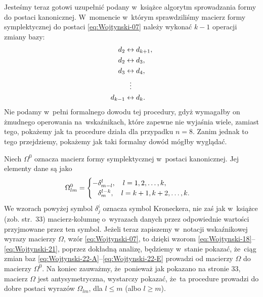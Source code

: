 \documentclass[a4paper,11pt]{article}
\begin{document}
Jesteśmy teraz gotowi uzupełnić podany w~książce algorytm sprowadzania
formy do postaci kanonicznej. W~momencie w~którym sprawdziliśmy macierz
formy symplektycznej do postaci \eqref{eq:Wojtynski-07} należy wykonać
$k - 1$ operacji zmiany bazy:
\begin{subequations}
  \begin{align}
    \label{eq:Wojtynski-22-A}
    d_{ 2 } &\leftrightarrow d_{ k + 1 }, \\
    \label{eq:Wojtynski-22-B}
    d_{ 2 } &\leftrightarrow d_{ 3 }, \\
    \label{eq:Wojtynski-22-C}
    d_{ 3 } &\leftrightarrow d_{ 4 }, \\
    \label{eq:Wojtynski-22-D}
    &\hspace{0.65em} \vdots \\
    \label{eq:Wojtynski-22-E}
    d_{ k - 1 } &\leftrightarrow d_{ k }.
  \end{align}
\end{subequations}
Nie podamy w~pełni formalnego dowodu tej procedury, gdyż wymagałby on
żmudnego operowania na~wskaźnikach, które zapewne nie wyjaśnia wiele,
zamiast tego, pokażemy jak ta procedure działa dla przypadku $n = 8$.
Zanim jednak to tego przejdziemy, pokażemy jak taki formalny dowód mógłby
wyglądać.

Niech $\Omega^{ 0 }$ oznacza macierz formy symplektycznej w~postaci kanonicznej.
Jej elementy dane są jako
\begin{equation}
  \label{eq:Wojtynski-23}
  \Omega^{ 0 }_{ l m } =
  \begin{cases}
    -\delta^{ l }_{ m - l }, \quad l = 1, 2, \ldots, k, \\
    \hphantom{-} \delta^{ l - k }_{ m }, \quad l = k + 1, k + 2, \ldots, k.
  \end{cases}
\end{equation}
We wzorach powyżej symbol $\delta^{ i }_{ j }$ oznacza symbol Kroneckera, nie zaś
jak w~książce (zob. str.~33) macierz-kolumnę o~wyrazach danych przez
odpowiednie wartości przyjmowane przez ten symbol. Jeżeli teraz zapiszemy
w~notacji wskaźnikowej wyrazy macierzy $\Omega$, wzór \eqref{eq:Wojtynski-07}, to
dzięki wzorom \eqref{eq:Wojtynski-18}--\eqref{eq:Wojtynski-21}, poprzez
dokładną analizę, będziemy w~stanie pokazać, że~ciąg zmian baz
\eqref{eq:Wojtynski-22-A}--\eqref{eq:Wojtynski-22-E} prowadzi od macierzy
$\Omega$ do macierzy $\Omega^{ 0 }$. Na koniec zauważmy, że~ponieważ jak pokazano na
stronie 33, macierz $\Omega$ jest antysymetryczna, wystarczy pokazać, że~ta
procedure prowadzi do dobre postaci wyrazów $\Omega_{ l m }$, dla $l \leq m$ (albo
$l \geq m$).
\end{document}
